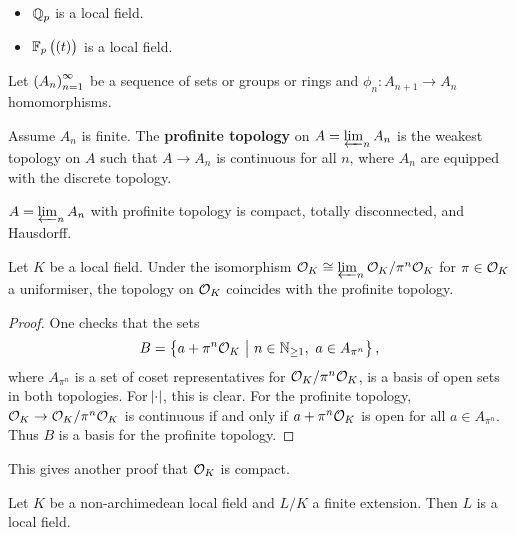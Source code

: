 \begin{example*}
\hfill
\begin{itemize}
\item $ \mathbb{Q}_p $ is a local field.
\item $ \FF_p\br{\br{t}} $ is a local field.
\end{itemize}
\end{example*}

Let $ \br{A_n}_{n = 1}^\infty $ be a sequence of sets or groups or rings and $ \phi_n : A_{n + 1} \to A_n $ homomorphisms.

\begin{definition}
Assume $ A_n $ is finite. The \textbf{profinite topology} on $ A = \varprojlim_n A_n $ is the weakest topology on $ A $ such that $ A \to A_n $ is continuous for all $ n $, where $ A_n $ are equipped with the discrete topology.
\end{definition}

\begin{fact*}
$ A = \varprojlim_n A_n $ with profinite topology is compact, totally disconnected, and Hausdorff.
\end{fact*}

\pagebreak

\begin{proposition}
Let $ K $ be a local field. Under the isomorphism $ \mathcal{O}_K \cong \varprojlim_n \mathcal{O}_K / \pi^n\mathcal{O}_K $ for $ \pi \in \mathcal{O}_K $ a uniformiser, the topology on $ \mathcal{O}_K $ coincides with the profinite topology.
\end{proposition}

\begin{proof}
One checks that the sets
$$ B = \cbr{a + \pi^n\OOO_K \st n \in \NN_{\ge 1}, \ a \in A_{\pi^n}}, $$
where $ A_{\pi^n} $ is a set of coset representatives for $ \mathcal{O}_K / \pi^n\mathcal{O}_K $, is a basis of open sets in both topologies. For $ \abs{\cdot} $, this is clear. For the profinite topology, $ \mathcal{O}_K \to \mathcal{O}_K / \pi^n\mathcal{O}_K $ is continuous if and only if $ a + \pi^n\mathcal{O}_K $ is open for all $ a \in A_{\pi^n} $. Thus $ B $ is a basis for the profinite topology.
\end{proof}

\begin{remark*}
This gives another proof that $ \mathcal{O}_K $ is compact.
\end{remark*}


\begin{lemma}
Let $ K $ be a non-archimedean local field and $ L / K $ a finite extension. Then $ L $ is a local field.
\end{lemma}

